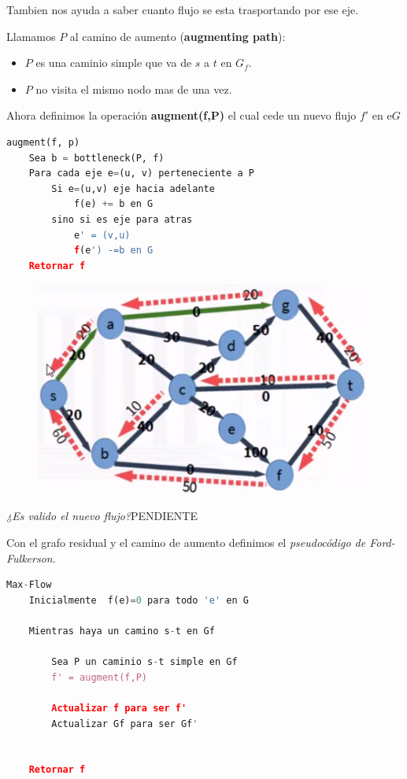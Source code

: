 \documentclass{article}
\begin{document}
Tambien nos ayuda a saber cuanto flujo se esta trasportando por ese eje.

Llamamos \(P\) al camino de aumento (\textbf{augmenting path}):

\begin{itemize}
    \item \(P\) es una caminio simple que va de \(s\) a \(t\) en \(G_f\).
    \item \(P\) no visita el mismo nodo mas de una vez.
\end{itemize}
 
Ahora definimos la operación \textbf{augment(f,P)} el cual cede un nuevo flujo \(f'\) en e\(G\)

\begin{lstlisting}[language=Python, caption=Operación de augment]
augment(f, p)
    Sea b = bottleneck(P, f)
    Para cada eje e=(u, v) perteneciente a P
        Si e=(u,v) eje hacia adelante
            f(e) += b en G
        sino si es eje para atras 
            e' = (v,u)
            f(e') -=b en G   
    Retornar f
\end{lstlisting}


\begin{figure}[h!]
    \includegraphics[width=\linewidth]{imagenes/camino-aumento.png}
\end{figure}

\textit{¿Es valido el nuevo flujo?}PENDIENTE

Con el grafo residual y el camino de aumento definimos el \textit{pseudocódigo de Ford-Fulkerson}.


\begin{lstlisting}[language=Python, caption=Operación de augment]
Max-Flow
    Inicialmente  f(e)=0 para todo 'e' en G

    Mientras haya un camino s-t en Gf

        Sea P un caminio s-t simple en Gf
        f' = augment(f,P)

        Actualizar f para ser f'
        Actualizar Gf para ser Gf'


    Retornar f
\end{lstlisting}
\end{document}
